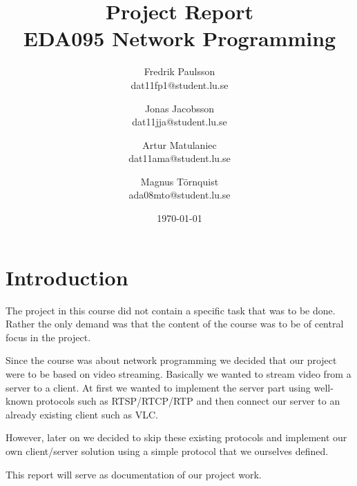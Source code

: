 \documentclass[a4paper]{article}
\title{Project Report \\ EDA095 Network Programming}
\date{\today}
\author{Fredrik Paulsson \\ dat11fp1@student.lu.se \and Jonas Jacobsson \\ dat11jja@student.lu.se \and Artur Matulaniec \\ dat11ama@student.lu.se \and Magnus Törnquist \\ ada08mto@student.lu.se}
\begin{document}
\maketitle

\section{Introduction}
The project in this course did not contain a specific task that was to be done. Rather the only demand was that the content of the course was to be of central focus in the project.

Since the course was about network programming we decided that our project were to be based on video streaming. Basically we wanted to stream video from a server to a client. At first we wanted to implement the server part using well-known protocols such as RTSP/RTCP/RTP and then connect our server to an already existing client such as VLC.

However, later on we decided to skip these existing protocols and implement our own client/server solution using a simple protocol that we ourselves defined.

This report will serve as documentation of our project work.
\end{document}

